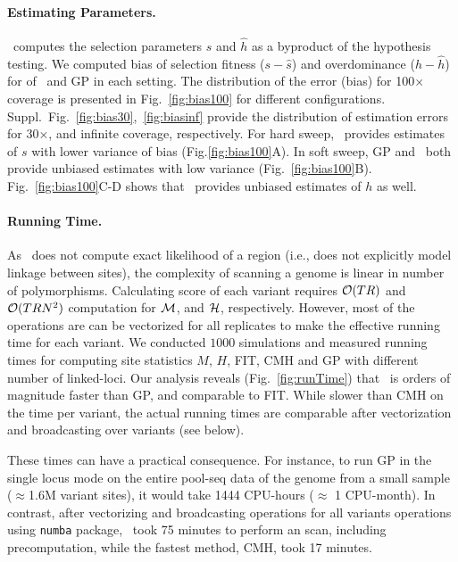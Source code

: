 \paragraph{Estimating Parameters.}
\comale\ computes the selection parameters $\hat{s}$ and $\hat{h}$ as
a byproduct of the hypothesis testing. We computed bias of selection
fitness ($s-\hat{s}$) and overdominance ($h-\hat{h}$) for of \comale\
and GP in each setting. The distribution of the error (bias) for
100$\times$ coverage is presented in Fig.~\ref{fig:bias100} for
different configurations.
Suppl.~Fig.~\ref{fig:bias30},~\ref{fig:biasinf} provide the
distribution of estimation errors for 30$\times$, and infinite
coverage, respectively.  For hard sweep, \comale\ provides estimates
of $s$ with lower variance of bias (Fig.\ref{fig:bias100}A). In soft
sweep, GP and \comale\ both provide unbiased estimates with low
variance (Fig.~\ref{fig:bias100}B). Fig.~\ref{fig:bias100}C-D shows
that \comale\ provides unbiased estimates of $h$ as well.

\paragraph{Running Time.}
As \comale\ does not compute exact likelihood of a region (i.e., does
not explicitly model linkage between sites), the complexity of
scanning a genome is linear in number of polymorphisms.  Calculating
score of each variant requires ${\cal O}(TR)$ and ${\cal O}(TRN^2)$ computation
for ${\cal M}$, and ${\cal H}$, respectively. However, most of the operations
are can be vectorized for all replicates to make the effective running
time for each variant.  We
conducted $1000$ simulations and measured running times for computing site 
statistics $M$, $H$, FIT, CMH and GP with different number of linked-loci.  Our
analysis reveals (Fig.~\ref{fig:runTime}) that \comale\ is orders of
magnitude faster than GP, and comparable to FIT. While slower than CMH
on the time per variant, the actual running times are comparable after
vectorization and broadcasting over variants (see below).

These times can have a practical consequence. For instance, to run GP
in the single locus mode on the entire pool-seq data of the \dmel genome from a
small sample ($\approx$1.6M variant sites), it would take 1444 CPU-hours
($\approx$ 1 CPU-month). In contrast, after vectorizing and
broadcasting operations for all variants operations using
\texttt{numba} package, \comale\ took 75 minutes to perform an
scan, including precomputation, while the fastest method, CMH, took 17 minutes.

